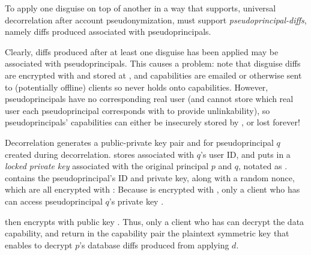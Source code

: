 To apply one disguise on top of another in a way that supports, \eg universal decorrelation after
account pseudonymization, \sys must support \emph{pseudoprincipal-diffs}, namely diffs produced
associated with pseudoprincipals. 

Clearly, diffs produced after at least one disguise has been applied may be associated with pseudoprincipals.
This causes a problem: note that disguise diffs are encrypted with  and stored at
, and capabilities are emailed or otherwise sent to (potentially offline) clients
so \sys never holds onto capabilities. However, pseudoprincipals have no corresponding real user
(and \sys cannot store which real user each pseudoprincipal corresponds with to provide
unlinkability), so pseudoprincipals' capabilities can either be insecurely stored by \sys, or lost
forever!

\iffalse
{}
Decorrelation generates a public-private key pair  and  for pseudoprincipal $q$
created during decorrelation.
\sys stores  associated with $q$'s user ID, and puts  in a \emph{locked private key}
associated with the original principal $p$ and $q$, notated as .  contains the
pseudoprincipal's ID and private key, along with a random nonce, which are all encrypted with :
Because  is encrypted with , only a client who has
 can access pseudoprincipal $q$'s private key .


\sys then encrypts  with public key .  
%
Thus, only a client who has  can decrypt the data capability, and return in the capability pair the plaintext symmetric key that enables \sys to decrypt $p$'s database diffs produced from applying $d$.


